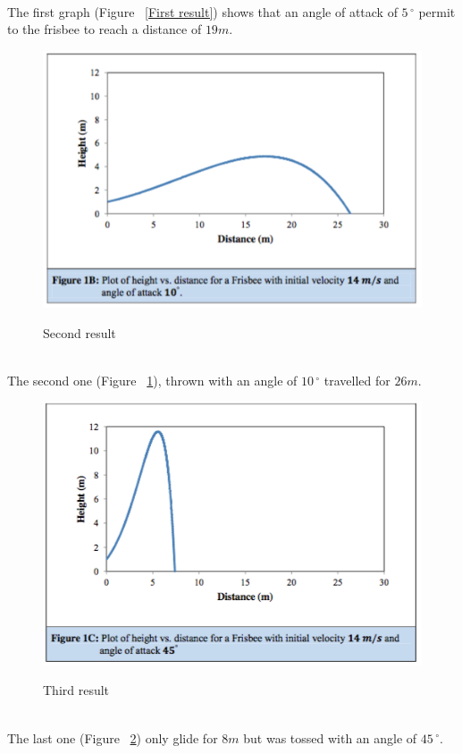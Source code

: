 \documentclass[10pt,a4paper]{report}
\begin{document}
\leavevmode
\\The first graph (Figure ~\ref{First result}) shows that an angle of attack of $5\,^{\circ}$ permit to the frisbee to reach a distance of $19m$.
\begin{figure}[H]
\centering
\includegraphics[scale=0.6]{graph2.jpg}
\caption{Second result}\cite{art5}
\label{Second result}
\end{figure}
\leavevmode
\\The second one (Figure ~\ref{Second result}), thrown with an angle of $10\,^{\circ}$ travelled for $26m$.
\begin{figure}[H]
\centering
\includegraphics[scale=0.6]{graph3.jpg}
\caption{Third result}\cite{art5}
\label{Third result}
\end{figure}
\leavevmode
\\The last one (Figure ~\ref{Third result}) only glide for $8m$ but was tossed with an angle of $45\,^{\circ} $.
\end{document}
